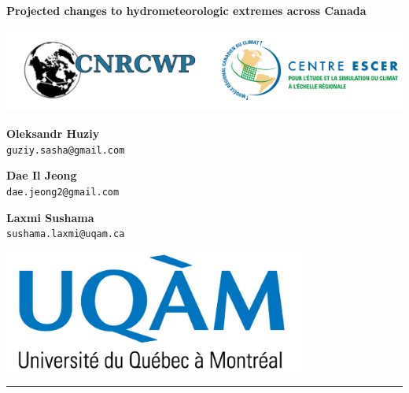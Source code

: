 \documentclass[a0,landscape]{a0poster}
\begin{document}


\noindent\begin{minipage}[b]{\linewidth}
\centering
\noindent \veryHuge \color{NavyBlue} \textbf{Projected changes to hydrometeorologic extremes across Canada} \color{Black}\\ %
\noindent\begin{minipage}[c]{0.2\linewidth}
      \center
      \includegraphics[width=25cm]{logo_cnrcwp_escer.png} %
\end{minipage} \hfill
%
\begin{minipage}[c]{0.15\linewidth}
  \center
  \Large \textbf{Oleksandr Huziy} \\
  \large \texttt{guziy.sasha@gmail.com}
\end{minipage}
%
\begin{minipage}[b]{0.01\linewidth}
 \center
\end{minipage}
%
\begin{minipage}[c]{0.15\linewidth}
   \center
   \Large \textbf{Dae Il Jeong} \\
   \large  \texttt{dae.jeong2@gmail.com}
\end{minipage}\hfill
%
\begin{minipage}[b]{0.01\linewidth}
 \center
\end{minipage}
%
\begin{minipage}[c]{0.15\linewidth}
   \center
   \Large \textbf{Laxmi Sushama} \\
   \large  \texttt{sushama.laxmi@uqam.ca}
\end{minipage}\hfill
%
\begin{minipage}[c]{0.2\linewidth}
  \center
  \includegraphics[width=10cm]{logo_uqam.png} %
\end{minipage}
\rule{\linewidth}{3pt}
\end{minipage}
%
\end{document}
